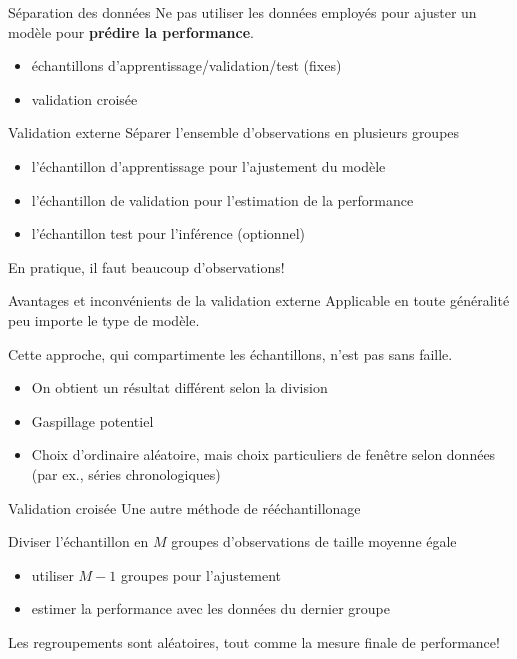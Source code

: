 \documentclass[
  ignorenonframetext,
]{beamer}
\providecommand{\tightlist}{%
  \setlength{\itemsep}{0pt}\setlength{\parskip}{0pt}}\usepackage{longtable,booktabs,array}
\begin{document}
\begin{frame}{Séparation des données}
\label{suxe9paration-des-donnuxe9es}
Ne pas utiliser les données employés pour ajuster un modèle pour
\textbf{prédire la performance}.

\begin{itemize}
\tightlist
\item
  échantillons d'apprentissage/validation/test (fixes)
\item
  validation croisée
\end{itemize}
\end{frame}

\begin{frame}{Validation externe}
\label{validation-externe}
Séparer l'ensemble d'observations en plusieurs groupes

\begin{itemize}
\tightlist
\item
  l'échantillon d'apprentissage pour l'ajustement du modèle
\item
  l'échantillon de validation pour l'estimation de la performance
\item
  l'échantillon test pour l'inférence (optionnel)
\end{itemize}

En pratique, il faut beaucoup d'observations!
\end{frame}

\begin{frame}{Avantages et inconvénients de la validation externe}
\label{avantages-et-inconvuxe9nients-de-la-validation-externe}
Applicable en toute généralité peu importe le type de modèle.

Cette approche, qui compartimente les échantillons, n'est pas sans
faille.

\begin{itemize}
\tightlist
\item
  On obtient un résultat différent selon la division
\item
  Gaspillage potentiel
\item
  Choix d'ordinaire aléatoire, mais choix particuliers de fenêtre selon
  données (par ex., séries chronologiques)
\end{itemize}
\end{frame}

\begin{frame}{Validation croisée}
\label{validation-croisuxe9e}
Une autre méthode de rééchantillonage

Diviser l'échantillon en \(M\) groupes d'observations de taille moyenne
égale

\begin{itemize}
\tightlist
\item
  utiliser \(M-1\) groupes pour l'ajustement
\item
  estimer la performance avec les données du dernier groupe
\end{itemize}

Les regroupements sont aléatoires, tout comme la mesure finale de
performance!
\end{frame}
\end{document}
